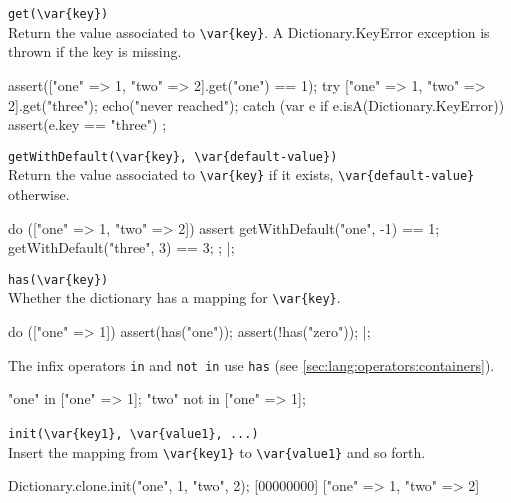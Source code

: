 \begin{urbiscriptapi}
\item \lstinline|get(\var{key})|\\
  Return the value associated to \lstinline|\var{key}|.  A
  Dictionary.KeyError exception is thrown if the key is missing.

\begin{urbiscript}
assert(["one" => 1, "two" => 2].get("one") == 1);
try
{
  ["one" => 1, "two" => 2].get("three");
  echo("never reached");
}
catch (var e if e.isA(Dictionary.KeyError))
{
  assert(e.key == "three")
};
\end{urbiscript}


\item \lstinline|getWithDefault(\var{key}, \var{default-value})|\\
  Return the value associated to  \lstinline|\var{key}| if it exists,
  \lstinline|\var{default-value}| otherwise.

\begin{urbiscript}
do (["one" => 1, "two" => 2])
{
  assert
  {
    getWithDefault("one",  -1) == 1;
    getWithDefault("three", 3) == 3;
  };
}|;
\end{urbiscript}


\item \lstinline|has(\var{key})|\\
  Whether the dictionary has a mapping for \lstinline|\var{key}|.

\begin{urbiscript}
do (["one" => 1])
{
  assert(has("one"));
  assert(!has("zero"));
}|;
\end{urbiscript}

  The infix operators \lstinline|in| and \lstinline|not in| use
  \lstinline|has| (see \autoref{sec:lang:operators:containers}).

\begin{urbiassert}
"one" in     ["one" => 1];
"two" not in ["one" => 1];
\end{urbiassert}

\item \lstinline|init(\var{key1}, \var{value1}, ...)|~\\
  Insert the mapping from \lstinline|\var{key1}| to
  \lstinline|\var{value1}| and so forth.

\begin{urbiscript}
Dictionary.clone.init("one", 1, "two", 2);
[00000000] ["one" => 1, "two" => 2]
\end{urbiscript}


\end{urbiscriptapi}
